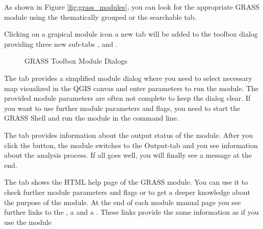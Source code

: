 As shown in Figure \ref{fig:grass_modules}, you can look for the appropriate GRASS module 
using the thematically grouped  or the searchable  tab. 

Clicking on a grapical module icon a new tab will be added to the toolbox dialog 
providing three new sub-tabs ,  and .


\begin{figure}[h]
\centering
\caption{GRASS Toolbox Module Dialogs \nixcaption}\label{fig:grass_module_dialog}
   \goodgap
   \goodgap
\end{figure}


The  tab provides a simplified module dialog where you need to 
select necessary map visualized in the QGIS canvas and enter parameters to run 
the module. The provided module parameters are often not complete to keep the dialog 
clear. If you want to use further module parameters and flags, you need to start the 
GRASS Shell and run the module in the command line.


The  tab provides information about the output status of the module. After 
you click the  button, the module switches to the Output-tab and you see 
information about the analysis process. If all goes well, you will finally see a 
 message at the end.


The  tab shows the HTML help page of the GRASS module. You can use it to 
check further module parameters and flags or to get a deeper knowledge about the 
purpose of the module. At the end of each module manual page you see further links to 
the , a  and a . 
These links provide the same information as if you use the module  

\begin{Tip}\caption{\textsc{Display results immediately}}
\end{Tip} 

